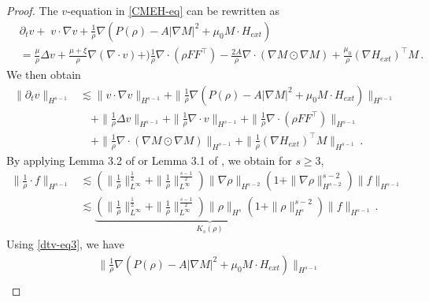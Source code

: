 \documentclass[reqno,11pt]{amsart}
\numberwithin{equation}{section}
\def\p{\partial}
\begin{document}
\begin{proof}

The $v$-equation in \eqref{CMEH-eq} can be rewritten as
\begin{equation}\label{dtv-eq1}
	\begin{aligned}
&\p_t v +\;  v \cdot \nabla v + \frac{1}{\rho}{\nabla \left( P(\rho) - A |\nabla M|^2 + \mu_0 M \cdot H_{ext} \right)} 
			\\ & 
			= \frac{\mu}{\rho} \Delta v+\frac{\mu+\xi}{\rho}\nabla(\nabla\cdot v)+) \frac{1}{\rho}\nabla\cdot(\rho F F^\top)- \frac{2A}{\rho} \nabla \cdot ( \nabla M \odot \nabla M) + \frac{\mu_0}{\rho} (\nabla H_{ext})^\top M \,.
	\end{aligned}
\end{equation}
We then obtain
\begin{equation}\label{dtv-eq2}
	\begin{aligned}
\|\partial_t v\|_{H^{s-1}}& \lesssim \|v \cdot \nabla v\|_{H^{s-1}} + \|\frac{1}{\rho}\nabla\left(P(\rho) - A|\nabla M|^2 + \mu_0 M \cdot H_{ext}\right)\|_{H^{s-1}} \\&\quad
+ \|\frac{1}{\rho}\Delta v\|_{H^{s-1}} +\|\frac{1}{\rho}\nabla \cdot v\|_{H^{s-1}} + \|\frac{1}{\rho}\nabla \cdot (\rho F F^\top)\|_{H^{s-1}} \\&
\quad+ \|\frac{1}{\rho}\nabla \cdot (\nabla M \odot \nabla M) \|_{H^{s-1}} + \|\frac{1}{\rho}(\nabla H_{ext})^\top M\|_{H^{s-1}}\,.
	\end{aligned}
\end{equation}
By applying Lemma 3.2 of \cite{JLT-M3AS-2020} or Lemma 3.1 of \cite{JLZ-CMS-2021}, we obtain for $s \geq 3$,
\begin{equation}\label{dtv-eq3}
	\begin{aligned}
\|\frac{1}{\rho} \cdot f\|_{H^{s-1}}
&\lesssim ( \|\frac{1}{\rho} \|_{L^\infty}^{\frac{1}{2}} +\|\frac{1}{\rho}\|_{L^\infty}^{\frac{s-1}{2}} ) \|\nabla \rho\|_{H^{s-2}} (1 + \|\nabla \rho\|^{s-2}_{H^{s-2}}) \|f\|_{H^{s-1}} \\&
\lesssim\underset{K_s(\rho)}{\underbrace{ ( \|\frac{1}{\rho}\|_{L^\infty}^{\frac{1}{2}} + \|\frac{1}{\rho}\|_{L^\infty}^{\frac{s-1}{2}} ) \|\rho\|_{H^s}(1 + \|\rho\|_{H^s}^{s-2}) }}\|f\|_{H^{s-1}} \,.
	\end{aligned}
\end{equation}
Using \eqref{dtv-eq3}, we have
\begin{equation}\label{dtv-eq4}
	\begin{aligned}
&\|\frac{1}{\rho} \nabla \left(P(\rho) - A|\nabla M|^2 + \mu_0 M \cdot H_{ext}\right)\|_{H^{s-1}} \\&

\end{aligned}
\end{equation}
\end{proof}
\end{document}
